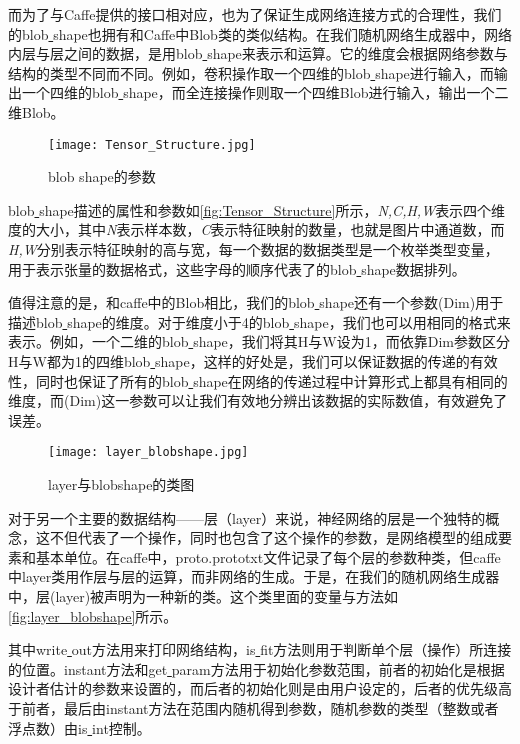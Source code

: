 而为了与Caffe提供的接口相对应，也为了保证生成网络连接方式的合理性，我们的blob\underline{ }shape也拥有和Caffe中Blob类的类似结构。在我们随机网络生成器中，网络内层与层之间的数据，是用blob\underline{ }shape来表示和运算。它的维度会根据网络参数与结构的类型不同而不同。例如，卷积操作取一个四维的blob\underline{ }shape进行输入，而输出一个四维的blob\underline{ }shape，而全连接操作则取一个四维Blob进行输入，输出一个二维Blob。

\begin{figure}[!htbp]
\centering
\texttt{[image: Tensor\_Structure.jpg]}
\caption{blob shape的参数}
\label{fig:Tensor_Structure}
\end{figure}

blob\underline{ }shape描述的属性和参数如\autoref{fig:Tensor_Structure}所示，\emph{N,C,H,W}表示四个维度的大小，其中\emph{N}表示样本数，\emph{C}表示特征映射的数量，也就是图片中通道数，而\emph{H,W}分别表示特征映射的高与宽，每一个数据的数据类型是一个枚举类型变量，用于表示张量的数据格式，这些字母的顺序代表了的blob\underline{ }shape数据排列。

值得注意的是，和caffe中的Blob相比，我们的blob\underline{ }shape还有一个参数(Dim)用于描述blob\underline{ }shape的维度。对于维度小于4的blob\underline{ }shape，我们也可以用相同的格式来表示。例如，一个二维的blob\underline{ }shape，我们将其H与W设为1，而依靠Dim参数区分H与W都为1的四维blob\underline{ }shape，这样的好处是，我们可以保证数据的传递的有效性，同时也保证了所有的blob\underline{ }shape在网络的传递过程中计算形式上都具有相同的维度，而(Dim)这一参数可以让我们有效地分辨出该数据的实际数值，有效避免了误差。

\begin{figure}[!htbp]
\centering
\texttt{[image: layer\_blobshape.jpg]}
\caption{layer与blobshape的类图}
\label{fig:layer_blobshape}
\end{figure}

对于另一个主要的数据结构——层（layer）来说，神经网络的层是一个独特的概念，这不但代表了一个操作，同时也包含了这个操作的参数，是网络模型的组成要素和基本单位。在caffe中，proto.prototxt文件记录了每个层的参数种类，但caffe中layer类用作层与层的运算，而非网络的生成。于是，在我们的随机网络生成器中，层(layer)被声明为一种新的类。这个类里面的变量与方法如\autoref{fig:layer_blobshape}所示。

其中write\underline{ }out方法用来打印网络结构，is\underline{ }fit方法则用于判断单个层（操作）所连接的位置。instant方法和get\underline{ }param方法用于初始化参数范围，前者的初始化是根据设计者估计的参数来设置的，而后者的初始化则是由用户设定的，后者的优先级高于前者，最后由instant方法在范围内随机得到参数，随机参数的类型（整数或者浮点数）由is\underline{ }int控制。

